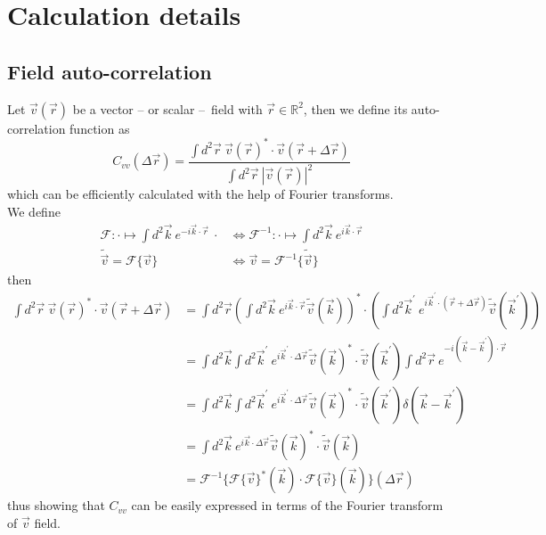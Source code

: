\documentclass[class=report, float=false, crop=false]{standalone}
\begin{document}
\chapter{Calculation details}
\label{appendix:calculation}

\section{Field auto-correlation}
\label{field_auto_correlation}

Let $\vec{v}(\vec{r})$ be a vector -- or scalar -- field with $\vec{r} \in \mathbb{R}^2$, then we define its auto-correlation function as
\begin{equation}
C_{vv}(\Delta \vec{r}) = \frac{\int d^2\vec{r}~ \vec{v}(\vec{r})^*\cdot\vec{v}(\vec{r}+\Delta \vec{r})}{\int d^2\vec{r}~ |\vec{v}(\vec{r})|^2}
\end{equation}
which can be efficiently calculated with the help of Fourier transforms.\\

We define
\begin{equation}
\begin{aligned}
\mathcal{F} : \cdot \mapsto \int d^2\vec{k}~ e^{-i\vec{k}\cdot\vec{r}} ~\cdot  &\Leftrightarrow \mathcal{F}^{-1} : \cdot \mapsto \int d^2\vec{k}~ e^{i\vec{k}\cdot\vec{r}}\\
\tilde{\vec{v}} = \mathcal{F}\{\vec{v}\} &\Leftrightarrow \vec{v} = \mathcal{F}^{-1}\{\tilde{\vec{v}}\}
\end{aligned}
\end{equation}
then
\begin{equation}
\begin{aligned}
\int d^2\vec{r}~ \vec{v}(\vec{r})^*\cdot\vec{v}(\vec{r}+\Delta \vec{r}) &= \int d^2\vec{r} \left(\int d^2\vec{k}~ e^{i\vec{k}\cdot\vec{r}}\tilde{\vec{v}}(\vec{k})\right)^*\cdot\left(\int d^2\vec{k}^{\prime}~ e^{i\vec{k}^{\prime}\cdot(\vec{r}+\Delta \vec{r})}\tilde{\vec{v}}(\vec{k}^{\prime})\right)\\
&= \int d^2\vec{k} \int d^2\vec{k}^{\prime}~ e^{i\vec{k}^{\prime}\cdot\Delta \vec{r}} \tilde{\vec{v}}(\vec{k})^*\cdot\tilde{\vec{v}}(\vec{k}^{\prime}) \int d^2\vec{r}~ e^{-i(\vec{k}-\vec{k}^{\prime})\cdot\vec{r}}\\
&= \int d^2\vec{k} \int d^2\vec{k}^{\prime}~ e^{i\vec{k}^{\prime}\cdot\Delta \vec{r}} \tilde{\vec{v}}(\vec{k})^*\cdot\tilde{\vec{v}}(\vec{k}^{\prime}) \delta(\vec{k}-\vec{k}^{\prime})\\
&=  \int d^2\vec{k}~ e^{i\vec{k}\cdot\Delta \vec{r}} \tilde{\vec{v}}(\vec{k})^*\cdot\tilde{\vec{v}}(\vec{k})\\
&= \mathcal{F}^{-1}\{\mathcal{F}\{\vec{v}\}^*(\vec{k})\cdot\mathcal{F}\{\vec{v}\}(\vec{k})\}(\Delta\vec{r})
\end{aligned}
\end{equation}
thus showing that $C_{vv}$ can be easily expressed in terms of the Fourier transform of $\vec{v}$ field.
\end{document}
